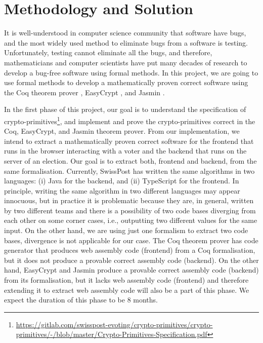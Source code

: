 \documentclass[a4paper]{article}
\begin{document}
\section{Methodology and Solution}
It is well-understood in computer science community that software have bugs, 
and the most widely used method to eliminate bugs from a software is testing. 
Unfortunately, testing cannot eliminate all the bugs, and therefore, 
mathematicians and computer scientists have put many decades of research to develop a bug-free 
software using formal methods. In this project, we are going to use 
formal methods to develop a mathematically proven correct software
using the Coq theorem prover \cite{the_coq_development_team_2019_3476303}, EasyCrypt \cite{10.1007/978-3-642-22792-9_5}, and 
Jasmin \cite{10.1145/3133956.3134078}. 


In the first phase of this project, our goal is to understand the specification of 
crypto-primitives\footnote{\url{https://gitlab.com/swisspost-evoting/crypto-primitives/crypto-primitives/-/blob/master/Crypto-Primitives-Specification.pdf}}, 
and implement  and prove the crypto-primitives correct in the Coq, EasyCrypt, and Jasmin theorem prover. From our implementation, 
we intend to extract a mathematically proven correct software for the frontend 
that runs in the browser interacting with a voter and the backend that runs on the server of an election. 
Our goal is to extract both, frontend and backend, from the same formalisation. Currently, 
SwissPost has written the same algorithms in two languages: (i) Java for the backend, and 
(ii) TypeScript for the frontend.  In principle, writing the same algorithm in 
two different languages may appear innocuous, but in 
practice it is problematic because they are, in general, written by two 
different teams and there is a possibility of two code bases diverging from each other on some corner cases, 
i.e., outputting two different values for the same input. On the other hand, 
we are using just one formalism to extract two code bases, divergence is 
not applicable for our case. 
The Coq theorem prover has code generator that produces web assembly code (frontend) from 
a Coq formalisation, but it does not produce a provable correct assembly code (backend). 
On the other hand, EasyCrypt and Jasmin  produce a provable correct assembly code (backend) from 
its formalisation, but it lacks web assembly code (frontend) and
therefore extending it to extract web assembly code will also be a part of this phase.  
We expect the duration of this phase to be 8 months. 
\end{document}

